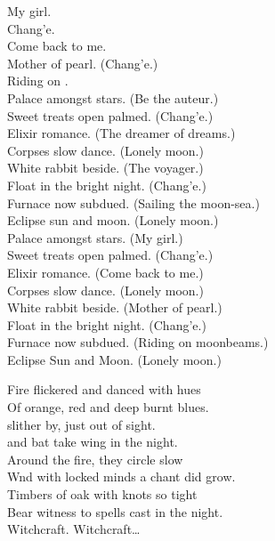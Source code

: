 My girl. \\
Chang'e. \\
Come back to me. \\
Mother of pearl. (Chang'e.) \\
Riding on . \\

Palace amongst stars. (Be the auteur.) \\
Sweet treats open palmed. (Chang'e.) \\
Elixir romance. (The dreamer of dreams.) \\
Corpses slow dance. (Lonely moon.) \\
White rabbit beside. (The voyager.) \\
Float in the bright night. (Chang'e.) \\
Furnace now subdued. (Sailing the moon-sea.) \\
Eclipse sun and moon. (Lonely moon.) \\

Palace amongst stars. (My girl.) \\
Sweet treats open palmed. (Chang'e.) \\
Elixir romance. (Come back to me.) \\
Corpses slow dance. (Lonely moon.) \\
White rabbit beside. (Mother of pearl.) \\
Float in the bright night. (Chang'e.) \\
Furnace now subdued. (Riding on moonbeams.) \\
Eclipse Sun and Moon. (Lonely moon.) \\


Fire flickered and danced with hues \\
Of orange, red and deep burnt blues. \\
 slither by, just out of sight. \\
 and bat take wing in the night. \\
Around the fire, they circle slow \\
Wnd with locked minds a chant did grow. \\
Timbers of oak with knots so tight \\
Bear witness to spells cast in the night. \\

Witchcraft. Witchcraft… \\

